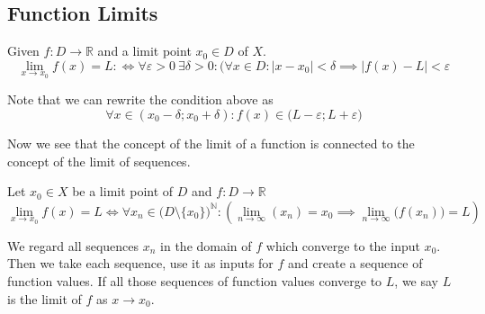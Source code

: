 \subsection{Function Limits}\label{ssec:function_limits}
\begin{definition}\label{def:func_limit}
   Given \(f: D \to \mathbb{R}\) and a limit point \(x_0 \in D\) of \(X\).
   \[\lim_{x \to x_0} f(x) = L :\iff \forall \varepsilon > 0~\exists \delta > 0: (\forall x \in D: \lvert x - x_0 \rvert < \delta \implies \lvert f(x) - L\rvert < \varepsilon\]
\end{definition}
\begin{remark}[Intuition]
   Note that we can rewrite the condition above as
   \[\forall x \in (x_0 - \delta; x_0 + \delta): f(x) \in \big(L - \varepsilon; L + \varepsilon\big)\]
   \begin{center}
      
   \end{center}
\end{remark}
Now we see that the concept of the limit of a function is connected to the concept of the limit of sequences.
\begin{proposition}[Function Limit = Sequence Limit]
   Let \(x_0 \in X\) be a limit point of \(D\) and \(f: D \to \mathbb{R}\)
   \[\lim_{x \to x_0} f(x) = L \iff \forall x_n \in \big(D\setminus\{x_0\}\big)^\mathbb{N}: \left(\lim_{n \to \infty}(x_n) = x_0 \implies  \lim_{n \to \infty}\big(f(x_n)\big) = L\right)\]
\end{proposition}
\begin{remark}[Intuition]
   We regard all sequences \(x_n\) in the domain of \(f\) which converge to the input \(x_0\).
   Then we take each sequence, use it as inputs for \(f\) and create a sequence of function values.
   If all those sequences of function values converge to \(L\), we say \(L\) is the limit of \(f\) as \(x \to x_0\).
\end{remark}

